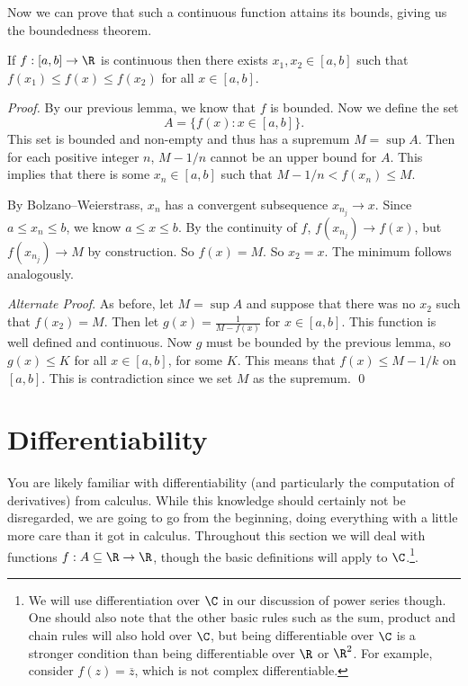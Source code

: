 \documentclass[a4paper]{scrartcl}
\begin{document}
Now we can prove that such a continuous function attains its bounds, giving us the boundedness theorem.

\begin{theorem}
	If $f:[a, b] \rightarrow \R$ is continuous then there exists $x_1, x_2 \in [a, b]$ such that $f(x_1) \leq f(x) \leq f(x_2)$ for all $x \in [a, b]$.
\end{theorem}
\begin{proof}
	By our previous lemma, we know that $f$ is bounded. Now we define the set
	$$
	A = \{f(x) : x \in [a, b]\}.
	$$
	This set is bounded and non-empty and thus has a supremum $M = \sup A$. Then for each positive integer $n$, $M - 1/n$ cannot be an upper bound for $A$. This implies that there is some $x_n \in [a, b]$ such that $M - 1/n < f(x_n) \leq M$.

	By Bolzano–Weierstrass, $x_n$ has a convergent subsequence $x_{n_j} \rightarrow x$. Since $a \leq x_n \leq b$, we know $a \leq x \leq b$. By the continuity of $f$, $f(x_{n_j}) \rightarrow f(x)$, but $f(x_{n_j}) \rightarrow M$ by construction. 
	So $f(x) = M$. So $x_2 = x$. The minimum follows analogously. \qedhere

	\emph{Alternate Proof}. As before, let $M = \sup A$ and suppose that there was no $x_2$ such that $f(x_2) = M$. Then let $g(x) = \frac{1}{M - f(x)}$ for $x \in [a, b]$. This function is well defined and continuous. Now $g$ must be bounded by the previous lemma, so $g(x) \leq K$ for all $x \in [a, b]$, for some $K$. This means that $f(x) \leq M - 1/k$ on $[a, b]$. This is contradiction since we set $M$ as the supremum. \hfill\qed
\end{proof}

\clearpage
\section{Differentiability}

You are likely familiar with differentiability (and particularly the computation of derivatives) from calculus. While this knowledge should certainly not be disregarded, we are going to go from the beginning, doing everything with a little more care than it got in calculus.
Throughout this section we will deal with functions $f: A \subseteq \R \rightarrow \R$,
though the basic definitions will apply to $\C$.\footnote{We will use differentiation over $\C$ in our discussion of power series though. One should also note that the other basic rules such as the sum, product and chain rules will also hold over $\C$, but being differentiable over $\C$ is a stronger condition than being differentiable over $\R$ or $\R^2$. For example, consider $f(z) = \overline{z}$, which is not complex differentiable.}.
\end{document}
